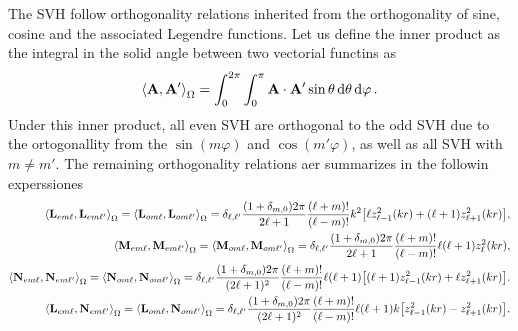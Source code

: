 The SVH follow orthogonality relations inherited from the orthogonality of sine, cosine and the associated Legendre functions. Let us define the inner product as the integral in the solid angle between two vectorial functins as 
%
\begin{align}
\ev{\vb{A},\vb{A}'}_\Omega = \int_0^{2\pi}\int_0^{\pi} \vb{A}\cdot\vb{A}'\sin\theta\dd{\theta}\dd{\varphi}.
\label{eq:inner}
\end{align}
%
Under this inner product, all even SVH are orthogonal to the odd SVH due to the ortogonallity from the $\sin(m\varphi)$ and $\cos(m'\varphi)$, as well as all SVH  with $m\neq m'$. The remaining orthogonality relations aer summarizes in the followin experssiones \cite{stratton_electromagnetic_2012}
%
\begin{align}
\ev{\vb{L}_{em\ell},\vb{L}_{em\ell'}}_\Omega = \ev{\vb{L}_{om\ell},\vb{L}_{om\ell'}}_\Omega = \delta_{\ell,\ell'}\frac{(1+\delta_{m,0})2\pi}{2\ell+1}\frac{(\ell+m)!}{(\ell-m)!}k^2\qty[ \ell z_{\ell-1}^2(kr) + (\ell+1)z_{\ell+1}^2(kr) ],\\
%
\ev{\vb{M}_{em\ell},\vb{M}_{em\ell'}}_\Omega = \ev{\vb{M}_{om\ell},\vb{M}_{om\ell'}}_\Omega = \delta_{\ell,\ell'}\frac{(1+\delta_{m,0})2\pi}{2\ell+1}\frac{(\ell+m)!}{(\ell-m)!}\ell(\ell+1)z_{\ell}^2(kr),\\
%
\ev{\vb{N}_{em\ell},\vb{N}_{em\ell'}}_\Omega = \ev{\vb{N}_{om\ell},\vb{N}_{om\ell'}}_\Omega = \delta_{\ell,\ell'}\frac{(1+\delta_{m,0})2\pi}{(2\ell+1)^2}\frac{(\ell+m)!}{(\ell-m)!}\ell(\ell+1)\qty[ (\ell+1) z_{\ell-1}^2(kr) + \ell z_{\ell+1}^2(kr) ]. \\
\ev{\vb{L}_{em\ell},\vb{N}_{em\ell'}}_\Omega = \ev{\vb{L}_{om\ell},\vb{N}_{om\ell'}}_\Omega = \delta_{\ell,\ell'}\frac{(1+\delta_{m,0})2\pi}{(2\ell+1)^2}\frac{(\ell+m)!}{(\ell-m)!}\ell(\ell+1)k\qty[ z_{\ell-1}^2(kr) - z_{\ell+1}^2(kr) ]. 
\end{align}
%
















































